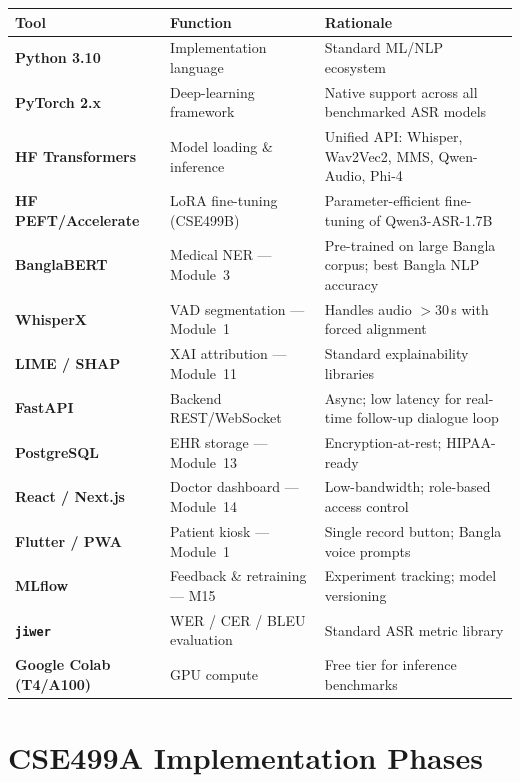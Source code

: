 \documentclass[11pt,a4paper]{article}
\begin{document}
\footnotesize\setlength{\tabcolsep}{4pt}\renewcommand{\arraystretch}{1.2}
\begin{tabularx}{\linewidth}{>{\bfseries}p{2.8cm} p{3.4cm} X}
\toprule
Tool & Function & Rationale \\
\midrule
Python 3.10          & Implementation language           & Standard ML/NLP ecosystem \\
PyTorch 2.x          & Deep-learning framework           & Native support across all benchmarked ASR models \\
HF Transformers      & Model loading \& inference        & Unified API: Whisper, Wav2Vec2, MMS, Qwen-Audio, Phi-4 \\
HF PEFT/Accelerate   & LoRA fine-tuning (CSE499B)        & Parameter-efficient fine-tuning of Qwen3-ASR-1.7B \\
BanglaBERT           & Medical NER --- Module~3          & Pre-trained on large Bangla corpus; best Bangla NLP accuracy \\
WhisperX             & VAD segmentation --- Module~1     & Handles audio $>$30\,s with forced alignment \\
LIME / SHAP          & XAI attribution --- Module~11     & Standard explainability libraries \\
FastAPI              & Backend REST/WebSocket            & Async; low latency for real-time follow-up dialogue loop \\
PostgreSQL           & EHR storage --- Module~13         & Encryption-at-rest; HIPAA-ready \\
React / Next.js      & Doctor dashboard --- Module~14    & Low-bandwidth; role-based access control \\
Flutter / PWA        & Patient kiosk --- Module~1        & Single record button; Bangla voice prompts \\
MLflow               & Feedback \& retraining --- M15    & Experiment tracking; model versioning \\
\texttt{jiwer}       & WER / CER / BLEU evaluation       & Standard ASR metric library \\
Google Colab (T4/A100) & GPU compute                    & Free tier for inference benchmarks \\
\bottomrule
\end{tabularx}
\normalsize

\section{CSE499A Implementation Phases}
\end{document}
